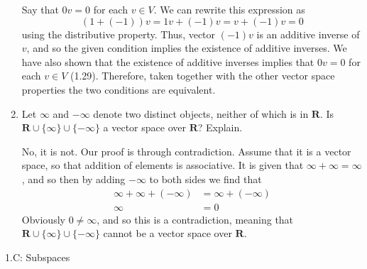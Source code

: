 \documentclass{book}
\begin{document}
\begin{enumerate}
Say that \(0v=0\) for each \(v \in V\).  We can rewrite this expression as \[(1+(-1))v=1v+(-1)v=v+(-1)v=0\] using the distributive property.  Thus, vector \((-1)v\) is an additive inverse of \(v\), and so the given condition implies the existence of additive inverses.  We have also shown that the existence of additive inverses implies that \(0v=0\) for each \(v \in V\) (1.29).  Therefore, taken together with the other vector space properties the two conditions are equivalent.

\item Let \(\infty\) and \(-\infty\) denote two distinct objects, neither of which is in \(\textbf{R}\).  Is \(\textbf{R} \cup \{\infty\} \cup \{-\infty\}\) a vector space over \(\textbf{R}\)? Explain.

No, it is not.  Our proof is through contradiction.  Assume that it is a vector space, so that addition of elements is associative.  It is given that \(\infty+\infty=\infty\), and so then by adding \(-\infty\) to both sides we find that
\begin{align*}
\infty+\infty+(-\infty) &= \infty+(-\infty) \\
\infty &= 0
\end{align*}
Obviously \(0 \neq \infty\), and so this is a contradiction, meaning that \(\textbf{R} \cup \{\infty\} \cup \{-\infty\}\) cannot be a vector space over \(\textbf{R}\).

\end{enumerate}

1.C: Subspaces
\end{document}
